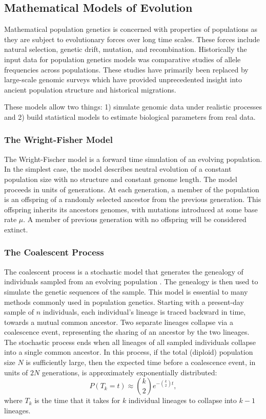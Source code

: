\subsection{Mathematical Models of Evolution}
\label{bg:bio:models}

Mathematical population genetics is concerned with properties of populations as they are subject to evolutionary forces over long time scales.
These forces include natural selection, genetic drift, mutation, and recombination.
Historically the input data for population genetics models was comparative studies of allele frequencies across populations.
These studies have primarily been replaced by large-scale genomic surveys which have provided unprecedented insight into ancient population structure and historical migrations.

These models allow two things: 1) simulate genomic data under realistic processes and 2) build statistical models to estimate biological parameters from real data.

\subsubsection{The Wright-Fisher Model}
\label{bg:bio:models:wrightfisher}

The Wright-Fischer model is a forward time simulation of an evolving population.
In the simplest case, the model describes neutral evolution of a constant population size with no structure and constant genome length.
The model proceeds in units of generations.
At each generation, a member of the population is an offspring of a randomly selected ancestor from the previous generation.
This offspring inherits its ancestors genomes, with mutations introduced at some base rate $\mu$.
A member of previous generation with no offspring will be considered extinct.

\subsubsection{The Coalescent Process}
\label{bg:bio:models:coalescent}

The coalescent process is a stochastic model that generates the genealogy of individuals sampled from an evolving population \cite{Wakeley:2009}.
The genealogy is then used to simulate the genetic sequences of the sample.
This model is essential to many methods commonly used in population genetics.
Starting with a present-day sample of $n$ individuals, each individual's lineage is traced backward in time, towards a mutual common ancestor.
Two separate lineages collapse via a coalescence event, representing the sharing of an ancestor by the two lineages.
The stochastic process ends when all lineages of all sampled individuals collapse into a single common ancestor.
In this process, if the total (diploid) population size $N$ is sufficiently large, then the expected time before a coalescence event, in units of $2N$ generations, is approximately exponentially distributed:
\begin{equation}
P(T_{k}=t) \approx \binom{k}{2} e^{-\binom{k}{2} t},
\end{equation}
where $T_k$ is the time that it takes for $k$ individual lineages to collapse into $k-1$ lineages.

